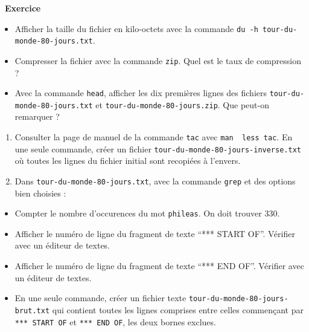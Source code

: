 \documentclass[
  11pt,
]{article}
\providecommand{\tightlist}{%
  \setlength{\itemsep}{0pt}\setlength{\parskip}{0pt}}
\newcounter{exo}
\newenvironment{exercice}[1]
{\par \medskip   \addtocounter{exo}{1} \noindent  
\begin{bclogo}[arrondi =0.1,   noborder = true, logo=\bccrayon, marge=4]{~\textbf{Exercice} \textbf{\theexo} {\itshape #1} }  \par}
{
\end{bclogo}
 \par \bigskip }
\newcounter{rque}
\newcounter{def}
\begin{document}
\begin{exercice}{}
\begin{itemize}
\tightlist
\item
  Afficher la taille du fichier en kilo-octets avec la commande
  \texttt{du\ -h\ tour-du-monde-80-jours.txt}.
\item
  Compresser la fichier avec la commande \texttt{zip}. Quel est le taux
  de compression ?
\item
  Avec la commande \texttt{head}, afficher les dix premières lignes des
  fichiers \texttt{tour-du-monde-80-jours.txt} et
  \texttt{tour-du-monde-80-jours.zip}. Que peut-on remarquer ?
\end{itemize}

\begin{enumerate}
\def\labelenumi{\arabic{enumi}.}
\setcounter{enumi}{6}
\tightlist
\item
  Consulter la page de manuel de la commande \texttt{tac} avec
  \texttt{man\ \textbar{}~less\ tac}. En une seule commande, créer un
  fichier \texttt{tour-du-monde-80-jours-inverse.txt} où toutes les
  lignes du fichier initial sont recopiées à l'envers.
\item
  Dans \texttt{tour-du-monde-80-jours.txt}, avec la commande
  \texttt{grep} et des options bien choisies :
\end{enumerate}

\begin{itemize}
\tightlist
\item
  Compter le nombre d'occurences du mot \texttt{phileas}. On doit
  trouver 330.
\item
  Afficher le numéro de ligne du fragment de texte ``*** START OF''.
  Vérifier avec un éditeur de textes.
\item
  Afficher le numéro de ligne du fragment de texte ``*** END OF''.
  Vérifier avec un éditeur de textes.
\item
  En une seule commande, créer un fichier texte
  \texttt{tour-du-monde-80-jours-brut.txt} qui contient toutes les
  lignes comprises entre celles commençant par \texttt{***\ START\ OF}
  et \texttt{***\ END\ OF}, les deux bornes exclues.
\end{itemize}

\end{exercice}
\end{document}
